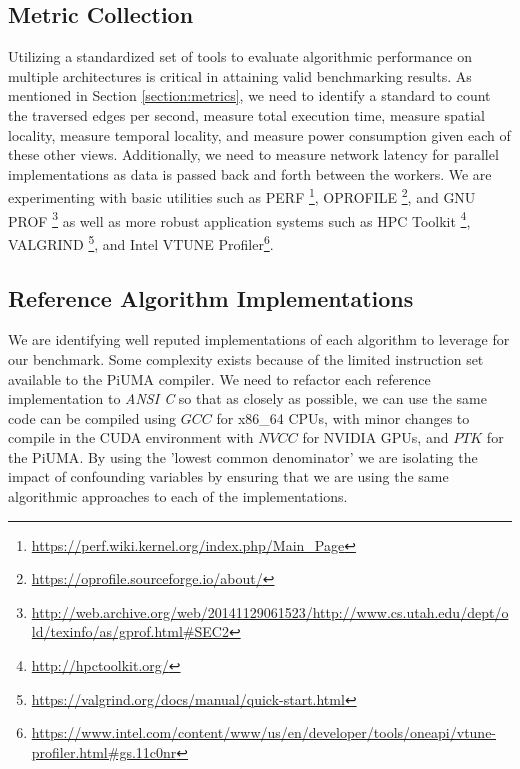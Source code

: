 \documentclass[letterpaper, 10pt]{article}
\begin{document}
\begin{multicols}{2}
{{    \subsection{Metric Collection}\label{section:telemetry}
        Utilizing a standardized set of tools to evaluate algorithmic performance on multiple architectures is critical in attaining valid benchmarking results. 
        As mentioned in Section \ref{section:metrics}, we need to identify a standard to count the traversed edges per second, measure total execution time, measure spatial locality, measure temporal locality, and measure power consumption given each of these other views. 
        Additionally, we need to measure network latency for parallel implementations as data is passed back and forth between the workers. 
        We are experimenting with basic utilities such as 
        PERF \footnote{\href{https://perf.wiki.kernel.org/index.php/Main_Page}{https://perf.wiki.kernel.org/index.php/Main\_Page}}, 
        OPROFILE \footnote{\href{https://oprofile.sourceforge.io/about/}{https://oprofile.sourceforge.io/about/}}, and 
        GNU PROF \footnote{\href{http://web.archive.org/web/20141129061523/http://www.cs.utah.edu/dept/old/texinfo/as/gprof.html\#SEC2}{http://web.archive.org/web/20141129061523/http://www.cs.utah.edu/dept/old/texinfo/as/gprof.html\#SEC2}} as well as more robust application systems such as 
        HPC Toolkit \footnote{\href{http://hpctoolkit.org/}{http://hpctoolkit.org/}}, 
        VALGRIND \footnote{\href{https://valgrind.org/docs/manual/quick-start.html}{https://valgrind.org/docs/manual/quick-start.html}}, and 
        Intel VTUNE Profiler\footnote{\href{https://www.intel.com/content/www/us/en/developer/tools/oneapi/vtune-profiler.html\#gs.11c0nr}{https://www.intel.com/content/www/us/en/developer/tools/oneapi/vtune-profiler.html\#gs.11c0nr}}. 

    \subsection{Reference Algorithm Implementations}
        \par{We are identifying well reputed implementations of each algorithm to leverage for our benchmark. Some complexity exists because of the limited instruction set available to the PiUMA compiler. 
        We need to refactor each reference implementation to \textit{ANSI C} so that as closely as possible, we can use the same code can be compiled using $GCC$ for x86\_64 CPUs, with minor changes to compile in the CUDA environment with $NVCC$ for NVIDIA GPUs, and $PTK$ for the PiUMA}.
        By using the 'lowest common denominator' we are isolating the impact of confounding variables by ensuring that we are using the same algorithmic approaches to each of the implementations.}

}
\end{multicols}
\end{document}
